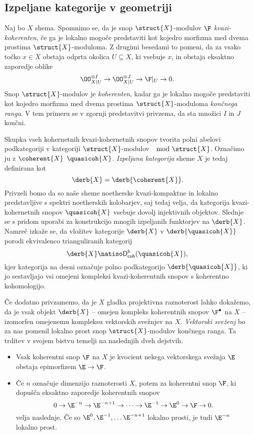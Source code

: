 \subsection*{Izpeljane kategorije v geometriji}

Naj bo $X$ shema. Spomnimo se, da je snop $\struct{X}$-modulov $\F$ \emph{kvazi-koherenten}, če ga je lokalno mogoče predstaviti kot kojedro morfizma med dvema prostima $\struct{X}$-moduloma. Z drugimi besedami to pomeni, da za vsako točko $x \in X$ obstaja odprta okolica $U \subseteq X$, ki vsebuje $x$, in obstaja eksaktno zaporedje oblike 
\[
    \OO_{X|U}^{\oplus I} \to \OO_{X|U}^{\oplus J} \to \F|_U \to 0.
\]
Snop $\struct{X}$-modulov je \emph{koherenten}, kadar ga je lokalno mogoče predstaviti kot kojedro morfizma med dvema prostima $\struct{X}$-moduloma \emph{končnega ranga}. V tem primeru se v zgornji predstavitvi privzema, da sta množici $I$ in $J$ končni.  

Skupka vseh kohernetnih \oz kvazi-kohernetnih snopov tvorita polni abelovi podkategoriji v kategoriji $\struct{X}$-modulov $\mod{\struct{X}}$. Označimo ju z $\coherent{X}$ \oz $\quasicoh{X}$. \emph{Izpeljana kategorija} sheme $X$ je tedaj definirana kot
\[
    \derb{X} = \derb{\coherent{X}}.
\]   
Privzeli bomo da so naše sheme noetherske \tj kvazi-kompaktne in lokalno predstavljive s spektri noetherskih kolobarjev, saj tedaj velja, da kategorija kvazi-kohernetnih snopov $\quasicoh{X}$ vsebuje dovolj injektivnih objektov. Slednje se s pridom uporabi za konstrukcijo mnogih izpeljanih funktorjev na $\derb{X}$. Namreč izkaže se, da vložitev kategorije $\derb{X}$ v $\derb{\quasicoh{X}}$ porodi ekvivalenco trianguliranih kategorij 
\[
    \derb{X} \natiso \mathsf{D}^b_{\mathsf{coh}}(\quasicoh{X}),
\]
kjer kategorija na desni označuje polno podkategorijo $\derb{\quasicoh{X}}$, ki jo sestavljajo vsi omejeni kompleksi kvazi-koherentnih snopov s koherentno kohomologijo. 

Če dodatno privzamemo, da je $X$ gladka projektivna raznoterost lahko dokažemo, da je vsak objekt $\derb{X}$ -- \tj omejen kompleks koherentnih snopov $\F^\bullet$ na $X$ -- izomorfen omejenemu kompleksu vektorskih svežnjev na $X$. \emph{Vektorski sveženj} bo za nas pomenil lokalno prost snop $\struct{X}$-modulov končnega ranga. Ta trditev v svojem bistvu temelji na naslednjih dveh dejstvih. 

\begin{itemize}[label = $\rhd$]
    \item Vsak koherentni snop $\F$ na $X$ je kvocient nekega vektorskega svežnja $\E$ \tj obstaja epimorfizem $\E \to \F$.
    \item Če $n$ označuje dimenzijo raznoterosti $X$, potem za koherentni snop $\F$, ki dopušča eksaktno zaporedje koherentnih snopov 
    \[
        0 \to \E^{-n} \to \E^{-n+1} \to \cdots \to \E^{-1} \to \E^0 \to \F \to 0.
    \]  
    velja naslednje. Če so $\E^0, \E^{-1}, \dots \E^{-n+1}$ lokalno prosti, je tudi $\E^{-n}$ lokalno prost. 
\end{itemize}

